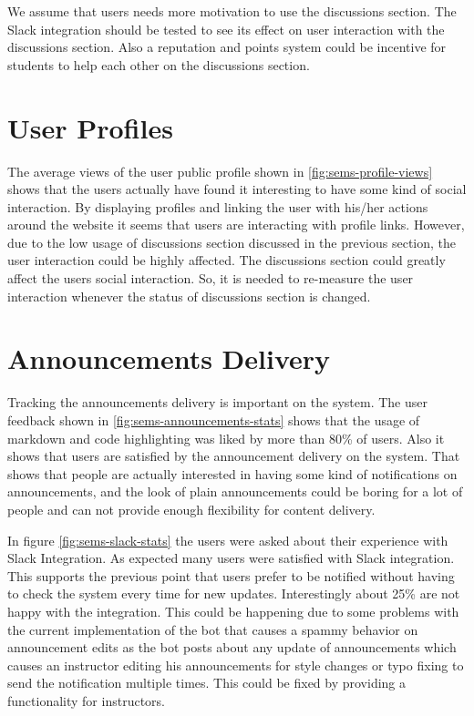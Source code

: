 \newParagraph
We assume that users needs more motivation to use the discussions section. The Slack\texttrademark{} integration should be tested to see its
effect on user interaction with the discussions section. Also a reputation and points system could be incentive for students to help each other
on the discussions section.

\section{User Profiles}
\label{sec:user-profiles-stats}
The average views of the user public profile shown in \ref{fig:sems-profile-views} shows that the users actually have found it interesting to have
some kind of social interaction. By displaying profiles and linking the user with his/her actions around the website it seems that users are
interacting with profile links. However, due to the low usage of discussions section discussed in the previous section, the user interaction
could be highly affected. The discussions section could greatly affect the users social interaction. So, it is needed to re-measure the user
interaction whenever the status of discussions section is changed.

\section{Announcements Delivery}
\label{sec:announcements-delivery-stats}
Tracking the announcements delivery is important on the system. The user feedback shown in \ref{fig:sems-announcements-stats} shows that the usage
of markdown and code highlighting was liked by more than 80\% of users. Also it shows that users are satisfied by the announcement delivery on the system.
That shows that people are actually interested in having some kind of notifications on announcements, and the look of plain announcements could be
boring for a lot of people and can not provide enough flexibility for content delivery.


\newParagraph
In figure \ref{fig:sems-slack-stats} the users were asked about their experience with Slack\texttrademark{} Integration. As expected
many users were satisfied with Slack\texttrademark{} integration. This supports the previous point that users prefer to be notified
without having to check the system every time for new updates. Interestingly about 25\% are not happy with the integration. This could
be happening due to some problems with the current implementation of the bot that causes a spammy behavior on announcement edits as the bot posts
about any update of announcements which causes an instructor editing his announcements for style changes or typo fixing to send the notification
multiple times. This could be fixed by providing a  functionality for instructors.

